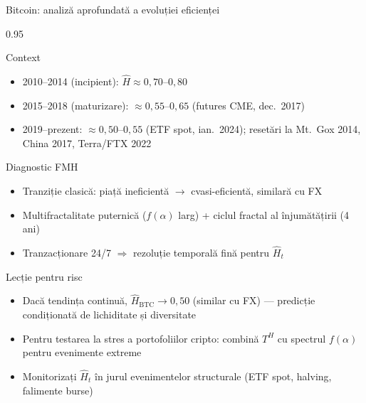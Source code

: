 \documentclass[9pt, aspectratio=169, t]{beamer}
\begin{document}
\begin{frame}[shrink=15]{Bitcoin: analiză aprofundată a evoluției eficienței}
\begin{cminipage}{0.95\textwidth}
\begin{block}{Context}
\begin{itemize}\setlength{\itemsep}{0pt}
    \item 2010--2014 (incipient): $\hat H\approx 0{,}70$--$0{,}80$
    \item 2015--2018 (maturizare): $\approx 0{,}55$--$0{,}65$ (futures CME, dec.\ 2017)
    \item 2019--prezent: $\approx 0{,}50$--$0{,}55$ (ETF spot, ian.\ 2024); resetări la Mt.\ Gox 2014, China 2017, Terra/FTX 2022
\end{itemize}
\end{block}
\begin{alertblock}{Diagnostic FMH}
\begin{itemize}\setlength{\itemsep}{0pt}
    \item Tranziție clasică: piață ineficientă $\to$ cvasi-eficientă, similară cu FX
    \item Multifractalitate puternică ($f(\alpha)$ larg) + ciclul fractal al înjumătățirii (4 ani)
    \item Tranzacționare 24/7 $\Rightarrow$ rezoluție temporală fină pentru $\hat H_t$
\end{itemize}
\end{alertblock}
\begin{exampleblock}{Lecție pentru risc}
\begin{itemize}\setlength{\itemsep}{0pt}
    \item Dacă tendința continuă, $\hat H_{\text{BTC}}\to 0{,}50$ (similar cu FX) --- predicție condiționată de lichiditate și diversitate
    \item Pentru testarea la stres a portofoliilor cripto: combină $T^H$ cu spectrul $f(\alpha)$ pentru evenimente extreme
    \item Monitorizați $\hat H_t$ în jurul evenimentelor structurale (ETF spot, halving, falimente burse)
\end{itemize}
\end{exampleblock}
\end{cminipage}
\end{frame}
\end{document}
